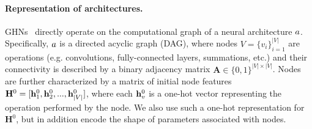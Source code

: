 \paragraph{Representation of architectures.} GHNs~\citep{zhang2018graph} directly operate on the computational graph of a neural architecture $a$. Specifically, $a$ is a directed acyclic graph (DAG), where nodes $V =\{v_i\}_{i=1}^{|V|}$ are operations (e.g. convolutions, fully-connected layers, summations, etc.) and their connectivity is described by a binary adjacency matrix $\mathbf{A}\in \{0,1\}^{|V|\times |V|}$. Nodes are further characterized by a matrix of initial node features $\mathbf{H}^{0}=[\mathbf{h}_1^{0}, \mathbf{h}_2^{0}, ..., \mathbf{h}_{|V|}^{0}]$, where each $\mathbf{h}_v^{0}$ is a one-hot vector representing the operation performed by the node. 
We also use such a one-hot representation for $\mathbf{H}^{0}$, but in addition encode the shape of parameters associated with nodes.

